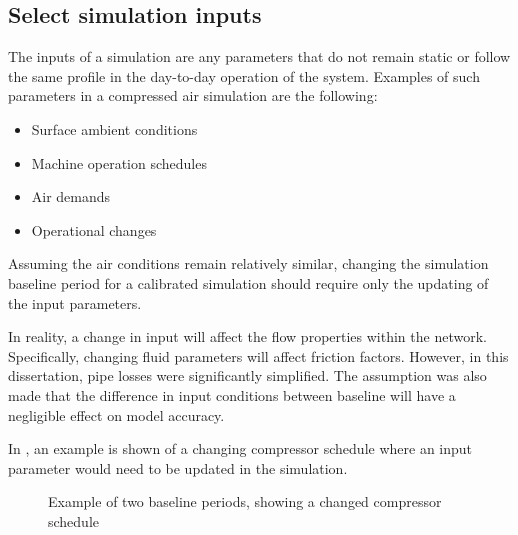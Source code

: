	\subsection{Select simulation inputs}
		The inputs of a simulation are any parameters that do not remain static or follow the same profile in the day-to-day operation of the system. Examples of such parameters in a compressed air simulation are the following:
		\begin{itemize}
			\item Surface ambient conditions
			\item Machine operation schedules
			\item Air demands
			\item Operational changes
		\end{itemize} 
	Assuming the air conditions remain relatively similar, changing the simulation baseline period for a calibrated simulation should require only the updating of the input parameters. \par  \clearpage
	In reality, a change in input will affect the flow properties within the network. Specifically, changing fluid parameters will affect friction factors. However, in this dissertation, pipe losses were significantly simplified. The assumption was also made that the difference in input conditions between baseline will have a negligible effect on model accuracy.
	\par
	In , an example is shown of a changing compressor schedule where an input parameter would need to be updated in the simulation.	

		\begin{figure}[h]
			\centering
			\fbox{}
			\caption{Example of two baseline periods, showing a changed compressor schedule}
			\label{fig: Compressor schedule}
		\end{figure}

